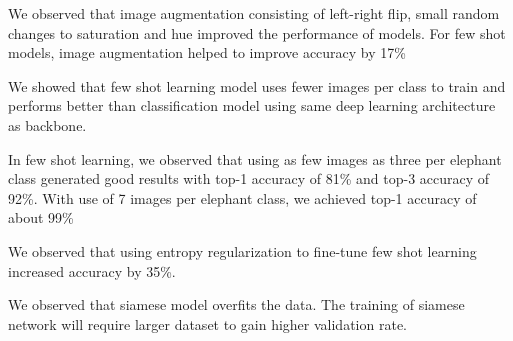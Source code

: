 \documentclass[10pt,twocolumn,letterpaper]{article}
\begin{document}
We observed that image augmentation consisting of left-right flip, small random changes to saturation and hue improved the performance of models. For few shot models, image augmentation helped to improve accuracy by 17\%

We showed that few shot learning model uses fewer images per class to train and performs better than classification model using same deep learning architecture as backbone.

In few shot learning, we observed that using as few images as three per elephant class generated good results with top-1 accuracy of 81\% and top-3 accuracy of 92\%. With use of 7 images per elephant class, we achieved top-1 accuracy of about 99\%

We observed that using entropy regularization to fine-tune few shot learning increased accuracy by 35\%.

We observed that siamese model overfits the data. The training of siamese network will require larger dataset to gain higher validation rate. 


\end{document}
